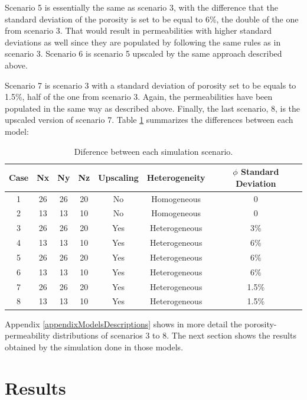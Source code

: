 Scenario 5 is essentially the same as scenario 3, with the difference that the standard deviation of the porosity is set to be equal to 6\%, the double of the one from scenario 3. That would result in permeabilities with higher standard deviations as well since they are populated by following the same rules as in scenario 3. Scenario 6 is scenario 5 upscaled by the same approach described above.

Scenario 7 is scenario 3 with a standard deviation of porosity set to be equals to 1.5\%, half of the one from scenario 3. Again, the permeabilities have been populated in the same way as described above. Finally, the last scenario, 8, is the upscaled version of scenario 7. Table \ref{fig:36} summarizes the differences between each model:

\begin{table}[htbp]
	\centering
	\caption{Diference between each simulation scenario.}
	\label{fig:36}
	\begin{tabular}{c c c c c c c}
		\toprule
		Case & Nx & Ny & Nz & Upscaling & Heterogeneity & $\phi$ Standard Deviation\\
		\midrule
		1 & 26 & 26 & 20 & No & Homogeneous & 0\\
		2 & 13 & 13 & 10 & No & Homogeneous & 0\\
		3 & 26 & 26 & 20 & Yes & Heterogeneous & 3\%\\
		4 & 13 & 13 & 10 & Yes & Heterogeneous & 6\%\\
		5 & 26 & 26 & 20 & Yes & Heterogeneous & 6\%\\
		6 & 13 & 13 & 10 & Yes & Heterogeneous & 6\%\\
		7 & 26 & 26 & 20 & Yes & Heterogeneous & 1.5\%\\
		8 & 13 & 13 & 10 & Yes & Heterogeneous & 1.5\%\\
		\bottomrule
	\end{tabular}
\end{table}

Appendix \ref{appendixModelsDescriptions} shows in more detail the porosity-permeability distributions of scenarios 3 to 8. The next section shows the results obtained by the simulation done in those models.

\section{Results}


